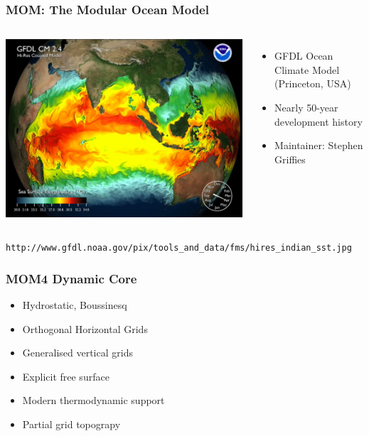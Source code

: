 \documentclass{beamer}
\begin{document}
\begin{frame}
    \frametitle{MOM: The Modular Ocean Model}

    \begin{columns}
        \includegraphics[width=\textwidth]{hires_indian_sst.jpg}
        \begin{itemize}
            \item GFDL Ocean Climate Model (Princeton, USA)
            \item Nearly 50-year development history
            \item Maintainer: Stephen Griffies
        \end{itemize}
    \end{columns}
    \vspace{10pt}
    {\tiny \lstinline|http://www.gfdl.noaa.gov/pix/tools_and_data/fms/hires_indian_sst.jpg|}
\end{frame}

\begin{frame}
    \frametitle{MOM4 Dynamic Core}
    
    \begin{itemize}
        \item Hydrostatic, Boussinesq
        \item Orthogonal Horizontal Grids
        \item Generalised vertical grids
		\item Explicit free surface
		\item Modern thermodynamic support
        \item Partial grid topograpy
    \end{itemize}
\end{frame}
\end{document}
